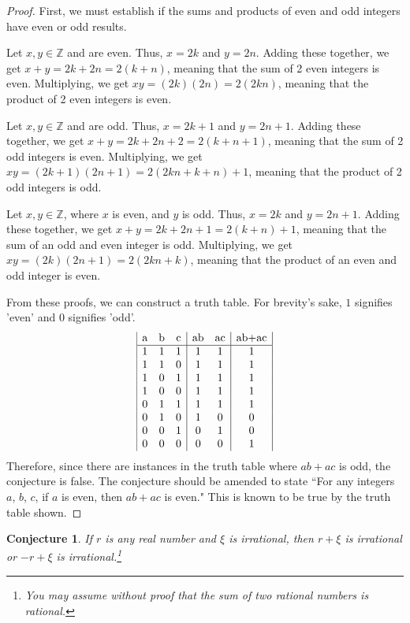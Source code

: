 \documentclass[11pt,titlepage]{article}		%
\def\Z{{\mathbb Z}}
\theoremstyle{theorem}
\newtheorem{conjecture}[theorem]{Conjecture}
\begin{document}
\begin{proof}
First, we must establish if the sums and products of even and odd integers have even or odd results. 

Let $x,y \in \Z$ and are even. Thus, $x = 2k$ and $y =2n$. Adding these together, we get $x+y = 2k + 2n = 2(k +n)$, meaning that the sum of 2 even integers is even. Multiplying, we get $xy=(2k)(2n)=2(2kn)$, meaning that the product of 2 even integers is even.

Let $x,y \in \Z$ and are odd. Thus, $x=2k+1$ and $y=2n+1$. Adding these together, we get $x+y = 2k+2n+2=2(k+n+1)$, meaning that the sum of 2 odd integers is even. Multiplying, we get $xy = (2k+1)(2n+1) = 2(2kn +k +n) + 1$, meaning that the product of 2 odd integers is odd.

Let $x,y \in \Z$, where $x$ is even, and $y$ is odd. Thus, $x=2k$ and $y=2n+1$. Adding these together, we get $x+y=2k+2n+1 = 2(k+n)+1$, meaning that the sum of an odd and even integer is odd. Multiplying, we get $xy=(2k)(2n+1)=2(2kn+k)$, meaning that the product of an even and odd integer is even.

From these proofs, we can construct a truth table. For brevity's sake, $1$ signifies 'even' and $0$ signifies 'odd'.
\begin{displaymath}
\begin{array}{|c c c| c c| c|}
$a$ & $b$ & $c$ & $ab$ & $ac$ & $ab+ac$\\
\hline
1 & 1 & 1 & 1 & 1 & 1\\
1 & 1 & 0 & 1 & 1 & 1\\
1 & 0 & 1 & 1 & 1 & 1\\
1 & 0 & 0 & 1 & 1 & 1\\
0 & 1 & 1 & 1 & 1 & 1\\
0 & 1 & 0 & 1 & 0 & 0\\
0 & 0 & 1 & 0 & 1 & 0\\
0 & 0 & 0 & 0 & 0 & 1
\end{array}
\end{displaymath}
Therefore, since there are instances in the truth table where $ab+ac$ is odd, the conjecture is false. The conjecture should be amended to state ``For any integers $a$, $b$, $c$, if $a$ is even, then $ab+ac$ is even." This is known to be true by the truth table shown.
\end{proof}

\clearpage

\begin{conjecture}
    If $r$ is any real number and $\xi$ is irrational, then $r + \xi$ is irrational or $-r + \xi$ is irrational.\footnote{You may assume without proof that the sum of two rational numbers is rational.}
\end{conjecture}
\end{document}
